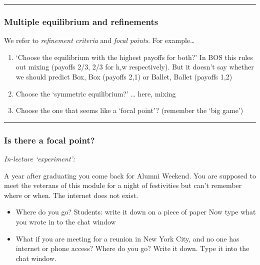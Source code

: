 \documentclass[]{article}
\begin{document}
\begin{center}\rule{0.5\linewidth}{\linethickness}\end{center}

\hypertarget{multiple-equilibrium-and-refinements}{%
\subsubsection{Multiple equilibrium and
refinements}\label{multiple-equilibrium-and-refinements}}

We refer to \emph{refinement criteria} and \emph{focal points}. For
example\ldots{}

\begin{enumerate}
\def\labelenumi{\arabic{enumi}.}
\item
  `Choose the equilibrium with the highest payoffs for both?' In BOS
  this rules out mixing (payoffs 2/3, 2/3 for h,w respectively). But it
  doesn't say whether we should predict Box, Box (payoffs 2,1) or
  Ballet, Ballet (payoffs 1,2)
\item
  Choose the `symmetric equilibrium?' \ldots{} here, mixing
\item
  Choose the one that seems like a `focal point'? (remember the `big
  game')
\end{enumerate}

\begin{center}\rule{0.5\linewidth}{\linethickness}\end{center}

\hypertarget{is-there-a-focal-point}{%
\subsubsection{Is there a focal point?}\label{is-there-a-focal-point}}

\emph{In-lecture `experiment':}

A year after graduating you come back for Alumni Weekend. You are
supposed to meet the veterans of this module for a night of festivities
but can't remember where or when. The internet does not exist.

\begin{itemize}
\item
  Where do you go? Students: write it down on a piece of paper Now type
  what you wrote in to the chat window
\item
  What if you are meeting for a reunion in New York City, and no one has
  internet or phone access? Where do you go? Write it down. Type it into
  the chat window.
\end{itemize}
\end{document}
